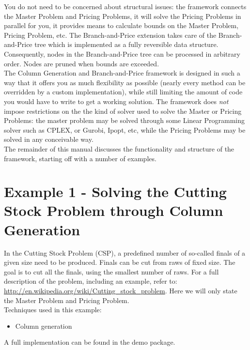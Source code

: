 \documentclass[a4paper]{article}
\begin{document}
You do not need to be concerned about structural issues: the framework connects the Master Problem and Pricing Problems, it will solve the Pricing Problems in parallel for you, it provides means to calculate bounds on the Master Problem, Pricing Problem, etc. The Branch-and-Price extension takes care of the Branch-and-Price tree which is implemented as a fully reversible data structure. Consequently, nodes in the Branch-and-Price tree can be processed in arbitrary order. Nodes are pruned when bounds are exceeded.\\ 
The Column Generation and Branch-and-Price framework is designed in such a way that it offers you as much flexibility as possible (nearly every method can be overridden by a custom implementation), while still limiting the amount of code you would have to write to get a working solution. The framework does \emph{not} impose restrictions on the the kind of solver used to solve the Master or Pricing Problems: the master problem may be solved through some Linear Programming solver such as CPLEX, or Gurobi, Ipopt, etc, while the Pricing Problems may be solved in any conceivable way.\\
The remainder of this manual discusses the functionality and structure of the framework, starting off with a number of examples.

\section{Example 1 - Solving the Cutting Stock Problem through Column Generation}\label{sec:cutting_stock}
In the Cutting Stock Problem (CSP), a predefined number of so-called finals of a given size need to be produced. Finals can be cut from raws of fixed size. The goal is to cut all the finals, using the smallest number of raws. For a full description of the problem, including an example, refer to: \url{http://en.wikipedia.org/wiki/Cutting_stock_problem}. Here we will only state the Master Problem and Pricing Problem.\\
Techniques used in this example:
\begin{itemize}
 \item Column generation
\end{itemize}
A full implementation can be found in the demo package.
\end{document}
